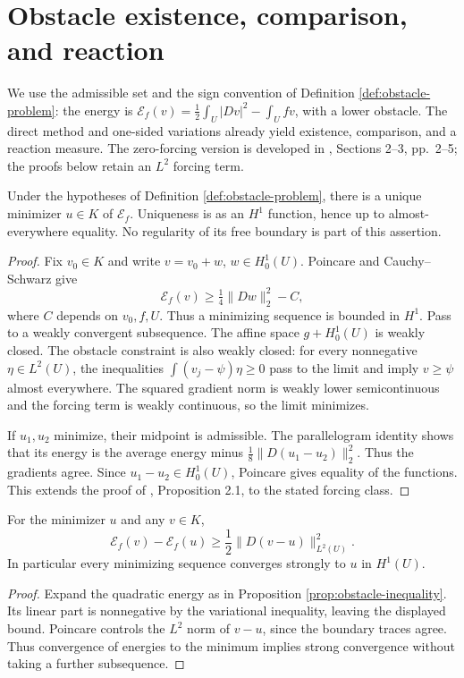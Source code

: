 \chapter{Obstacle existence, comparison, and reaction}\label{sec:obstacle-variational}
We use the admissible set and the sign convention of Definition \ref{def:obstacle-problem}: the energy is $\mathcal E_f(v)=\frac12\int_U|Dv|^2-\int_Ufv$, with a lower obstacle. The direct method and one-sided variations already yield existence, comparison, and a reaction measure. The zero-forcing version is developed in \cite{Fig18}, Sections 2--3, pp.~2--5; the proofs below retain an $L^2$ forcing term.

\begin{theorem}\label{thm:obstacle-existence}
Under the hypotheses of Definition \ref{def:obstacle-problem}, there is a unique minimizer $u\in K$ of $\mathcal E_f$. Uniqueness is as an $H^1$ function, hence up to almost-everywhere equality. No regularity of its free boundary is part of this assertion.
\end{theorem}
\begin{proof}
Fix $v_0\in K$ and write $v=v_0+w$, $w\in H^1_0(U)$. Poincare and Cauchy--Schwarz give
\[
 \mathcal E_f(v)\geq\tfrac14\|Dw\|_2^2-C,
\]
where $C$ depends on $v_0,f,U$. Thus a minimizing sequence is bounded in $H^1$. Pass to a weakly convergent subsequence. The affine space $g+H^1_0(U)$ is weakly closed. The obstacle constraint is also weakly closed: for every nonnegative $\eta\in L^2(U)$, the inequalities $\int(v_j-\psi)\eta\geq0$ pass to the limit and imply $v\geq\psi$ almost everywhere. The squared gradient norm is weakly lower semicontinuous and the forcing term is weakly continuous, so the limit minimizes.

If $u_1,u_2$ minimize, their midpoint is admissible. The parallelogram identity shows that its energy is the average energy minus $\frac18\|D(u_1-u_2)\|_2^2$. Thus the gradients agree. Since $u_1-u_2\in H^1_0(U)$, Poincare gives equality of the functions. This extends the proof of \cite{Fig18}, Proposition 2.1, to the stated forcing class.
\end{proof}

\begin{proposition}\label{prop:obstacle-energy-gap}
For the minimizer $u$ and any $v\in K$,
\[
 \mathcal E_f(v)-\mathcal E_f(u)\geq\frac12\|D(v-u)\|_{L^2(U)}^2.
\]
In particular every minimizing sequence converges strongly to $u$ in $H^1(U)$.
\end{proposition}
\begin{proof}
Expand the quadratic energy as in Proposition \ref{prop:obstacle-inequality}. Its linear part is nonnegative by the variational inequality, leaving the displayed bound. Poincare controls the $L^2$ norm of $v-u$, since the boundary traces agree. Thus convergence of energies to the minimum implies strong convergence without taking a further subsequence.
\end{proof}

